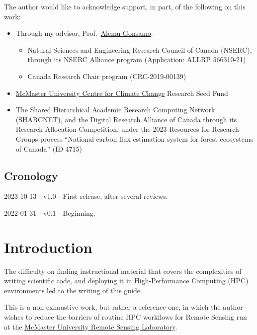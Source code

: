 \documentclass[
]{book}
\providecommand{\tightlist}{%
  \setlength{\itemsep}{0pt}\setlength{\parskip}{0pt}}
\begin{document}
The author would like to acknowledge support, in part, of the following on this
work:

\begin{itemize}
\tightlist
\item
  Through my advisor, Prof.~\href{https://scholar.google.ca/citations?user=snRPOMkAAAAJ}{Alemu Gonsamo}:

  \begin{itemize}
  \tightlist
  \item
    Natural Sciences and Engineering Research Council of Canada (NSERC), through its NSERC
    Alliance program (Application: ALLRP 566310-21)
  \item
    Canada Research Chair program (CRC-2019-00139)
  \end{itemize}
\item
  \href{https://climate.mcmaster.ca}{McMaster University Centre for Climate Change} Research Seed Fund
\item
  The Shared Hierarchical Academic Research Computing Network (\href{https://www.sharcnet.ca/}{SHARCNET}), and
  the Digital Research Alliance of Canada through its Research Allocation Competition, under the
  2023 Resources for Research Groups process ``National carbon flux estimation system for forest
  ecosystems of Canada'' (ID 4715)
\end{itemize}

\hypertarget{cronology}{%
\section{Cronology}\label{cronology}}

2023-10-13 - v1.0 - First release, after several reviews.

2022-01-31 - v0.1 - Beginning.

\hypertarget{introduction}{%
\chapter{Introduction}\label{introduction}}

The difficulty on finding instructional material that covers the complexities of
writing scientific code, and deploying it in High-Performance Computing (HPC)
environments led to the writing of this guide.

This is a non-exhaustive work, but rather a reference one, in which the author
wishes to reduce the barriers of routine HPC workflows for Remote Sensing run at
the \href{https://remotesensing-mcmaster.org}{McMaster University Remote Sensing Laboratory}.
\end{document}
